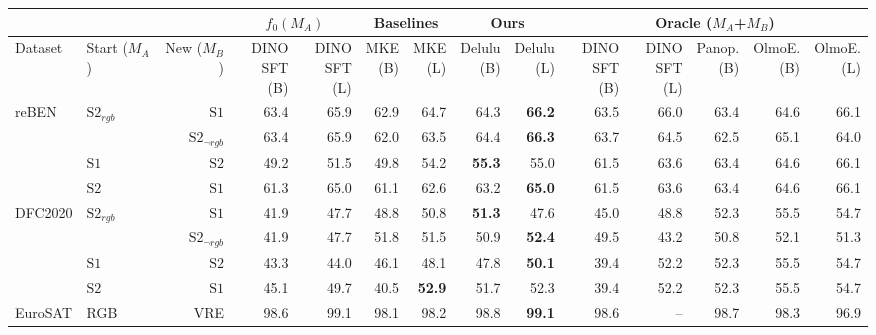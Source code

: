 \begin{tabular}{llr | r r r r r r r r r r r}
\toprule
\multicolumn{3}{c}{} & \multicolumn{2}{c|}{$f_0(M_A)$} & \multicolumn{2}{c|}{Baselines} & \multicolumn{2}{c|}{Ours} & \multicolumn{5}{c}{Oracle ($M_A$+$M_B$)} \\
\midrule
Dataset & \shortstack[c]{Start\\($M_A$)} & \shortstack[c]{New\\($M_B$)} & \shortstack[c]{DINO\\SFT (B)} & \shortstack[c]{DINO\\SFT (L)} & \shortstack[c]{MKE\\(B)} & \shortstack[c]{MKE\\(L)} & \shortstack[c]{Delulu\\(B)} & \shortstack[c]{Delulu\\(L)} & \shortstack[c]{DINO\\SFT (B)} & \shortstack[c]{DINO\\SFT (L)} & \shortstack[c]{Panop.\\(B)} & \shortstack[c]{OlmoE.\\(B)} & \shortstack[c]{OlmoE.\\(L)} \\
\midrule
  \multirow{4}{*}{reBEN} & \multirow{2}{*}{$\mathrm{S2}_{rgb}$} & $\mathrm{S1}$ & 63.4 & 65.9 & 62.9 & 64.7 & 64.3 & \textbf{66.2} & 63.5 & 66.0 & 63.4 & 64.6 & 66.1 \\
   &  & $\mathrm{S2}_{\neg rgb}$ & 63.4 & 65.9 & 62.0 & 63.5 & 64.4 & \textbf{66.3} & 63.7 & 64.5 & 62.5 & 65.1 & 64.0 \\
   & $\mathrm{S1}$ & $\mathrm{S2}$ & 49.2 & 51.5 & 49.8 & 54.2 & \textbf{55.3} & 55.0 & 61.5 & 63.6 & 63.4 & 64.6 & 66.1 \\
   & $\mathrm{S2}$ & $\mathrm{S1}$ & 61.3 & 65.0 & 61.1 & 62.6 & 63.2 & \textbf{65.0} & 61.5 & 63.6 & 63.4 & 64.6 & 66.1 \\
  \midrule
  \multirow{4}{*}{DFC2020} & \multirow{2}{*}{$\mathrm{S2}_{rgb}$} & $\mathrm{S1}$ & 41.9 & 47.7 & 48.8 & 50.8 & \textbf{51.3} & 47.6 & 45.0 & 48.8 & 52.3 & 55.5 & 54.7 \\
   &  & $\mathrm{S2}_{\neg rgb}$ & 41.9 & 47.7 & 51.8 & 51.5 & 50.9 & \textbf{52.4} & 49.5 & 43.2 & 50.8 & 52.1 & 51.3 \\
   & $\mathrm{S1}$ & $\mathrm{S2}$ & 43.3 & 44.0 & 46.1 & 48.1 & 47.8 & \textbf{50.1} & 39.4 & 52.2 & 52.3 & 55.5 & 54.7 \\
   & $\mathrm{S2}$ & $\mathrm{S1}$ & 45.1 & 49.7 & 40.5 & \textbf{52.9} & 51.7 & 52.3 & 39.4 & 52.2 & 52.3 & 55.5 & 54.7 \\
  \midrule
  EuroSAT & RGB & VRE & 98.6 & 99.1 & 98.1 & 98.2 & 98.8 & \textbf{99.1} & 98.6 & -- & 98.7 & 98.3 & 96.9 \\
\bottomrule
\end{tabular}
